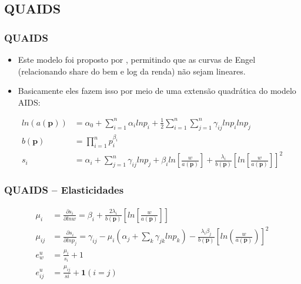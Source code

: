 \documentclass{beamer}
\begin{document}
\subsection{QUAIDS}
\begin{frame}[fragile]\frametitle{QUAIDS}
\begin{itemize}
  \item Este modelo foi proposto por \citet{Banks2007}, permitindo que as curvas de Engel (relacionando share do bem e log da renda) não sejam lineares.
  \item Basicamente eles fazem isso por meio de uma extensão quadrática do modelo AIDS:
\end{itemize}
\begin{eqnarray*}
ln(a(\mathbf{p})) &= \alpha_{0}+\sum_{i=1}^{n} \alpha_{i} lnp_{i}+\frac{1}{2}\sum_{i=1}^{n} \sum_{j=1}^{n} \gamma_{ij} lnp_{i} lnp_{j}\\
b(\mathbf{p})&=\prod_{i=1}^{n}p_{i}^{\beta_{i}}\\
s_{i}&=\alpha_{i}+\sum_{j=1}^{n}\gamma_{ij}lnp_{j}+\beta_{i}ln \left[ \frac{w}{a(\mathbf{p})}\right]+\frac{\lambda_{i}}{b(\mathbf{p})}\left[ ln \left[\frac{w}{a(\mathbf{p})}  \right] \right] ^{2}
\end{eqnarray*}
\hyperlink{Graf_ev}{}
\end{frame}

\begin{frame}[fragile]\frametitle{QUAIDS -- Elasticidades}
\begin{align*}    
\mu_{i}&=\frac{\partial s_{i}}{\partial ln w}=\beta_{i}+\frac{2\lambda_{i}}{b(\mathbf{p})} \left[ln \left[ \frac{w}{a(\mathbf{p})}  \right]   \right]\\
\mu_{ij}&=\frac{\partial s_{i}}{\partial ln p_{j}}=\gamma_{ij}-\mu_{i}\left(\alpha_{j} +\sum_{k} \gamma_{jk} lnp_{k}  \right) - \frac{\lambda_{i} \beta_{j}}{b(\mathbf{p})} \left[ ln \left( \frac{w}{a(\mathbf{p})} \right) \right]^{2}\\
e_{w}^{u}&=\frac{\mu_{i}}{s_{i}}+1\\
e_{ij}^{u}&=\frac{\mu_{ij}}{s{i}}+\mathbf{1}(i=j)
\end{align*}
\end{frame}
\end{document}
